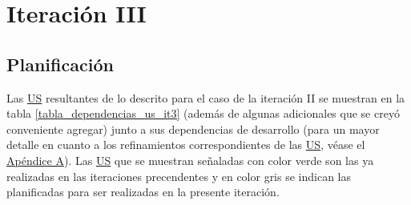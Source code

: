 \documentclass[a4paper, 12pt,twoside]{report}  %
\numberwithin{equation}{subsection} %
\begin{document}
\section{Iteración III}
\subsection{Planificación}
Las \hyperlink{US}{US} resultantes de lo descrito para el caso de la iteración II se muestran en la tabla \ref{tabla_dependencias_us_it3} (además de algunas adicionales que se creyó conveniente agregar) junto a sus dependencias de desarrollo (para un mayor detalle en cuanto a los refinamientos correspondientes de las \hyperlink{US}{US}, véase el \hyperlink{apendice_a}{Apéndice A}). Las \hyperlink{US}{US} que se muestran señaladas con color verde son las ya realizadas en las iteraciones precendentes y en color gris se indican las planificadas para ser realizadas en la presente iteración.
\end{document}
